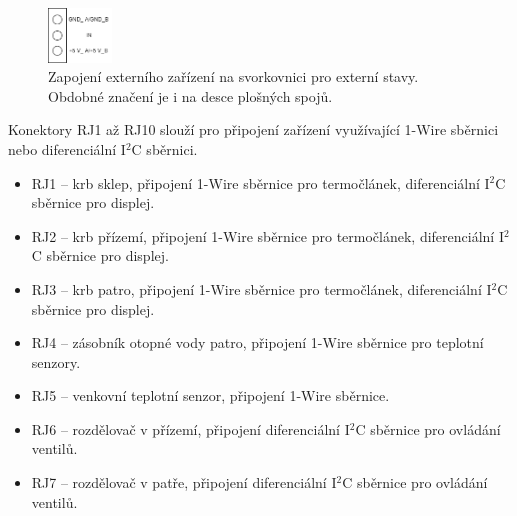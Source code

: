 \begin{Czech}
\begin{figure}[H]
    \centering
    \includegraphics[width=0.15\textwidth]{pictures/all/hardware/terminal-block-external-states.png}
    \caption{Zapojení externího zařízení na svorkovnici pro externí stavy. Obdobné značení je i na desce plošných spojů.}
    \label{fig:terminal-block-external-state}
\end{figure}
\end{Czech}

\begin{Czech}
\end{Czech}

\begin{Czech}
Konektory RJ1 až RJ10 slouží pro připojení zařízení využívající 1-Wire sběrnici nebo diferenciální I$^2$C sběrnici.
\end{Czech}

\begin{Czech}
\begin{itemize}
  \item RJ1 – krb sklep, připojení 1-Wire sběrnice pro termočlánek, diferenciální I$^2$C sběrnice pro displej.
  \item RJ2 – krb přízemí, připojení 1-Wire sběrnice pro termočlánek, diferenciální I$^2$C sběrnice pro displej.
  \item RJ3 – krb patro, připojení 1-Wire sběrnice pro termočlánek, diferenciální I$^2$C sběrnice pro displej.
  \item RJ4 – zásobník otopné vody patro, připojení 1-Wire sběrnice pro teplotní senzory.
  \item RJ5 – venkovní teplotní senzor, připojení 1-Wire sběrnice.
  \item RJ6 – rozdělovač v přízemí, připojení diferenciální I$^2$C sběrnice pro ovládání ventilů.
  \item RJ7 – rozdělovač v patře, připojení diferenciální I$^2$C sběrnice pro ovládání ventilů.
\end{itemize}
\end{Czech}

\begin{Czech}
\end{Czech}

